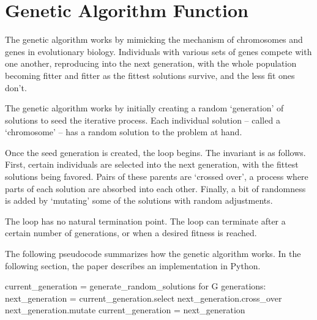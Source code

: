 \section{Genetic Algorithm Function}

The genetic algorithm works by mimicking the mechanism of chromosomes and genes in evolutionary biology. Individuals with various sets of genes compete with one another, reproducing into the next generation, with the whole population becoming fitter and fitter as the fittest solutions survive, and the less fit ones don't.

The genetic algorithm works by initially creating a random `generation' of solutions to seed the iterative process. Each individual solution -- called a `chromosome' -- has a random solution to the problem at hand.  

Once the seed generation is created, the loop begins. The invariant is as follows. First, certain individuals are selected into the next generation, with the fittest solutions being favored. Pairs of these parents are `crossed over', a process where parts of each solution are absorbed into each other. Finally, a bit of randomness is added by `mutating' some of the solutions with random adjustments. 

The loop has no natural termination point. The loop can terminate after a certain number of generations, or when a desired fitness is reached. 

The following pseudocode summarizes how the genetic algorithm works. In the following section, the paper describes an implementation in Python.

\begin{python}

current_generation = generate_random_solutions     
for G generations:                                 
    next_generation = current_generation.select    
    next_generation.cross_over	                   
    next_generation.mutate	                       
    current_generation = next_generation           

\end{python}